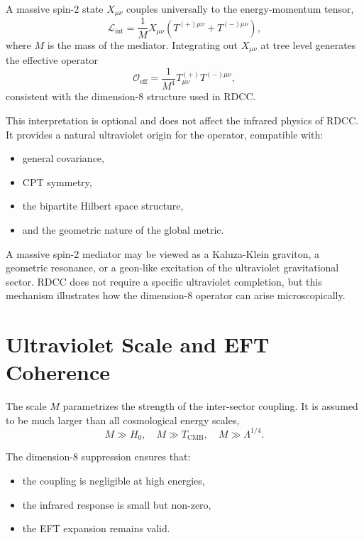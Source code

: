 \documentclass[11pt,a4paper]{article}
\begin{document}
A massive spin-2 state $X_{\mu\nu}$ couples universally to the energy-momentum
tensor,
\begin{equation}
\mathcal{L}_{\mathrm{int}}
=
\frac{1}{M} X_{\mu\nu}
\left(
T^{(+)\mu\nu}
+
T^{(-)\mu\nu}
\right),
\end{equation}
where $M$ is the mass of the mediator. Integrating out $X_{\mu\nu}$ at tree
level generates the effective operator
\begin{equation}
\mathcal{O}_{\mathrm{eff}}
=
\frac{1}{M^4}
T^{(+)}_{\mu\nu} T^{(-)\mu\nu},
\end{equation}
consistent with the dimension-8 structure used in RDCC.

This interpretation is optional and does not affect the infrared physics of
RDCC. It provides a natural ultraviolet origin for the operator, compatible
with:
\begin{itemize}[leftmargin=0.8cm]
  \item general covariance,
  \item CPT symmetry,
  \item the bipartite Hilbert space structure,
  \item and the geometric nature of the global metric.
\end{itemize}

A massive spin-2 mediator may be viewed as a Kaluza-Klein graviton, a geometric
resonance, or a geon-like excitation of the ultraviolet gravitational sector.
RDCC does not require a specific ultraviolet completion, but this mechanism
illustrates how the dimension-8 operator can arise microscopically.


\section[Ultraviolet Scale]{Ultraviolet Scale and EFT Coherence}

The scale $M$ parametrizes the strength of the inter-sector coupling. It is
assumed to be much larger than all cosmological energy scales,
\begin{equation}
M \gg H_0, \quad M \gg T_{\mathrm{CMB}}, \quad M \gg \Lambda^{1/4}.
\end{equation}

The dimension-8 suppression ensures that:
\begin{itemize}[leftmargin=0.8cm]
  \item the coupling is negligible at high energies,
  \item the infrared response is small but non-zero,
  \item the EFT expansion remains valid.
\end{itemize}
\end{document}
